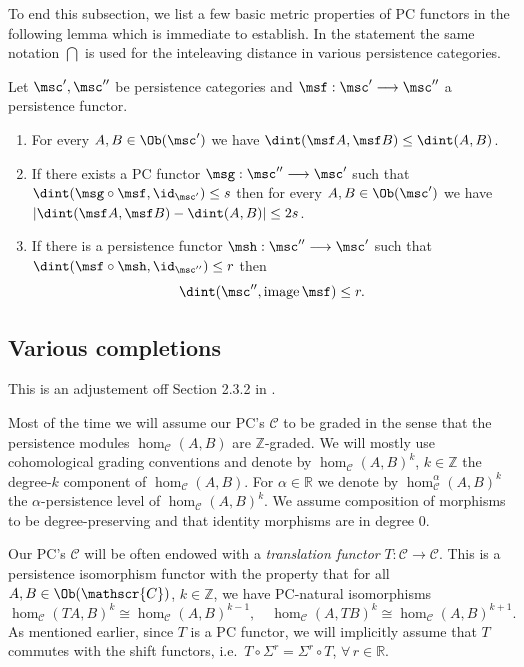 To end this subsection, we list a few basic metric properties of PC
functors in the following lemma which is immediate to establish. In
the statement the same notation $\dint$ is used for the inteleaving
distance in various persistence categories.
\begin{lem} \label{l:d-func} Let $\msc', \msc''$ be persistence categories and
  $\msf: \msc' \longrightarrow \msc''$ a persistence functor.
  \begin{enumerate}
  \item For every $A, B \in \Ob(\msc')$ we have
    $\dint(\msf A, \msf B) \leq \dint(A,B)$.
  \item If there exists a PC functor
    $\msg: \msc'' \longrightarrow \msc'$ such that
    $\dint(\msg \circ \msf, \id_{\msc'}) \leq s$ then for every
    $A, B \in \Ob(\msc')$ we have
    $|\dint(\msf A, \msf B) - \dint (A,B)| \leq 2s$.
  \item If there is a persistence functor $\msh: \msc'' \longrightarrow \msc'$
    such that $\dint(\msf \circ \msh, \id_{\msc''}) \leq r$ then
    $$\dint(\msc'', \textnormal{image\,}\msf) \leq r.$$
  \end{enumerate}
\end{lem}

\subsection{Various completions} \label{sbsb:comp} This is an adjustement off Section 2.3.2 in \cite{ABC26}.

Most of the time we will assume our PC's $\mathscr{C}$ to be graded in
the sense that the persistence modules $\hom_{\mathscr{C}}(A,B)$ are
$\mathbb{Z}$-graded. We will mostly use cohomological grading
conventions and denote by $\hom_{\mathscr{C}}(A,B)^k$,
$k \in \mathbb{Z}$ the degree-$k$ component of
$\hom_{\mathscr{C}}(A,B)$. For $\alpha \in \mathbb{R}$ we denote by
$\hom^{\alpha}_{\mathscr{C}}(A,B)^k$ the $\alpha$-persistence level of
$\hom_{\mathscr{C}}(A,B)^k$. We assume composition of morphisms
to be degree-preserving and that identity morphisms are in degree $0$.

Our PC's $\mathscr{C}$ will be often endowed with a {\em translation
  functor} $T: \mathscr{C} \longrightarrow \mathscr{C}$. This is a persistence
isomorphism functor with the property that for all
$A, B \in \Ob(\mathscr{C})$, $k \in \mathbb{Z}$, we have PC-natural
isomorphisms
$$\hom_{\mathscr{C}}(TA,B)^k \cong \hom_{\mathscr{C}}(A,B)^{k-1},
\quad \hom_{\mathscr{C}}(A,TB)^k \cong
\hom_{\mathscr{C}}(A,B)^{k+1}.$$ As mentioned earlier, since $T$ is a
PC functor, we will implicitly assume that $T$ commutes with the shift
functors, i.e.~$T \circ \Sigma^{r} = \Sigma^r \circ T$,
$\forall \, r \in \mathbb{R}$.


